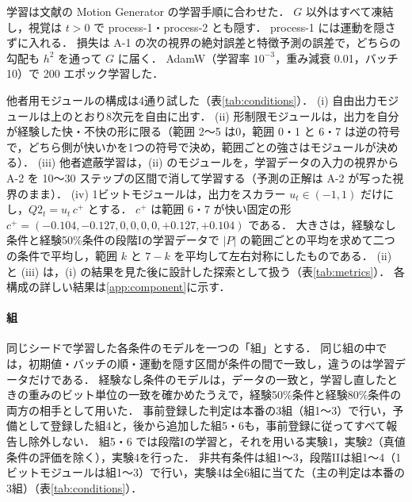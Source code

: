 学習は文献\cite{noguchi2022superposition}の Motion Generator の学習手順に合わせた．
$G$ 以外はすべて凍結し，視覚は $t>0$ で process-1・process-2 とも隠す．
process-1 には運動を隠さずに入れる．
損失は A-1 の次の視界の絶対誤差と特徴予測の誤差で，どちらの勾配も $h^2$ を通って $G$ に届く．
AdamW（学習率 $10^{-3}$，重み減衰 0.01，バッチ 10）で 200 エポック学習した．

他者用モジュールの構成は4通り試した（表\ref{tab:conditions}）．
(i) 自由出力モジュールは上のとおり8次元を自由に出す．
(ii) 形制限モジュールは，出力を自分が経験した快・不快の形に限る（範囲 2〜5 は0，範囲 0・1 と 6・7 は逆の符号で，どちら側が快いかを1つの符号で決め，範囲ごとの強さはモジュールが決める）．
(iii) 他者遮蔽学習は，(ii) のモジュールを，学習データの入力の視界から A-2 を 10〜30 ステップの区間で消して学習する（予測の正解は A-2 が写った視界のまま）．
(iv) 1ビットモジュールは，出力をスカラー $u_t\in(-1,1)$ だけにし，$Q2_t = u_t\, c^{+}$ とする．
$c^{+}$ は範囲 6・7 が快い固定の形 $c^{+}=(-0.104,-0.127,0,0,0,0,+0.127,+0.104)$ である．
大きさは，経験なし条件と経験50\%条件の段階Iの学習データで $|P|$ の範囲ごとの平均を求めて二つの条件で平均し，範囲 $k$ と $7-k$ を平均して左右対称にしたものである．
(ii) と (iii) は，(i) の結果を見た後に設計した探索として扱う（表\ref{tab:metrics}）．
各構成の詳しい結果は\ref{app:component}に示す．

\paragraph{組}
同じシードで学習した各条件のモデルを一つの「組」とする．
同じ組の中では，初期値・バッチの順・運動を隠す区間が条件の間で一致し，違うのは学習データだけである．
経験なし条件のモデルは，データの一致と，学習し直したときの重みのビット単位の一致を確かめたうえで，経験50\%条件と経験80\%条件の両方の相手として用いた．
事前登録した判定は本番の3組（組1〜3）で行い，予備として登録した組4と，後から追加した組5・6も，事前登録に従ってすべて報告し除外しない．
組5・6 では段階Iの学習と，それを用いる実験1，実験2（真値条件の評価を除く），実験4を行った．
非共有条件は組1〜3，段階IIは組1〜4（1ビットモジュールは組1〜3）で行い，実験4は全6組に当てた（主の判定は本番の3組）（表\ref{tab:conditions}）．

\begin{table}[t]
  \centering
  \small
  \caption{条件と組の一覧．$p$ は規則の一歩を選ぶ確率で，実際に規則で動いた一歩の割合は経験50\%条件で48\%，経験80\%条件で57\%である．}
  \label{tab:conditions}
  
\end{table}

